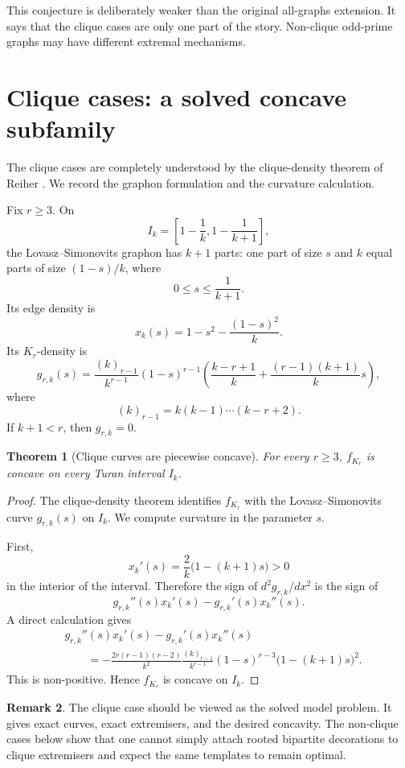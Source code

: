 \documentclass[11pt]{amsart}
\newtheorem{theorem}{Theorem}[section]
\theoremstyle{definition}
\newtheorem{remark}[theorem]{Remark}
\newcommand{\1}{\mathbf 1}
\begin{document}
This conjecture is deliberately weaker than the original all-graphs extension.  It says that the clique cases are only one part of the story.  Non-clique odd-prime graphs may have different extremal mechanisms.

\section{Clique cases: a solved concave subfamily}

The clique cases are completely understood by the clique-density theorem of Reiher \cite{ReiherCliqueDensity}.  We record the graphon formulation and the curvature calculation.

Fix $r\ge 3$.  On
\[
   I_k=\left[1-\frac1k,1-\frac1{k+1}\right],
\]
the Lovasz--Simonovits graphon has $k+1$ parts: one part of size $s$ and $k$ equal parts of size $(1-s)/k$, where
\[
   0\le s\le \frac1{k+1}.
\]
Its edge density is
\[
   x_k(s)=1-s^2-\frac{(1-s)^2}{k}.
\]
Its $K_r$-density is
\[
   g_{r,k}(s)=
   \frac{(k)_{r-1}}{k^{r-1}}(1-s)^{r-1}
   \left(
      \frac{k-r+1}{k}+\frac{(r-1)(k+1)}{k}s
   \right),
\]
where
\[
   (k)_{r-1}=k(k-1)\cdots(k-r+2).
\]
If $k+1<r$, then $g_{r,k}=0$.

\begin{theorem}[Clique curves are piecewise concave]
For every $r\ge 3$, $f_{K_r}$ is concave on every Turan interval $I_k$.
\end{theorem}

\begin{proof}
The clique-density theorem identifies $f_{K_r}$ with the Lovasz--Simonovits curve $g_{r,k}(s)$ on $I_k$.  We compute curvature in the parameter $s$.

First,
\[
   x_k'(s)=\frac{2}{k}\bigl(1-(k+1)s\bigr)>0
\]
in the interior of the interval.  Therefore the sign of $d^2g_{r,k}/dx^2$ is the sign of
\[
   g_{r,k}''(s)x_k'(s)-g_{r,k}'(s)x_k''(s).
\]
A direct calculation gives
\[
\begin{split}
&g_{r,k}''(s)x_k'(s)-g_{r,k}'(s)x_k''(s)\\
&\qquad =-
\frac{2r(r-1)(r-2)}{k^2}
\frac{(k)_{r-1}}{k^{r-1}}
(1-s)^{r-3}\bigl(1-(k+1)s\bigr)^2.
\end{split}
\]
This is non-positive.  Hence $f_{K_r}$ is concave on $I_k$.
\end{proof}

\begin{remark}
The clique case should be viewed as the solved model problem.  It gives exact curves, exact extremisers, and the desired concavity.  The non-clique cases below show that one cannot simply attach rooted bipartite decorations to clique extremisers and expect the same templates to remain optimal.
\end{remark}
\end{document}
